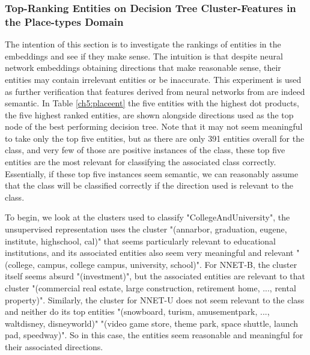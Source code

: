 \subsubsection{Top-Ranking Entities on Decision Tree Cluster-Features in the Place-types Domain}\label{ch5:place-typesentities}

The intention of this section is to investigate the rankings of entities in the embeddings and see if they make sense. The intuition is that despite neural network embeddings obtaining directions that make reasonable sense, their entities may contain irrelevant entities or be inaccurate. This experiment is used as further verification that features derived from neural networks from  are indeed semantic.  In Table \ref{ch5:placeent} the five entities with the highest dot products, the five highest ranked entities, are shown alongside directions used as the top node of the best performing decision tree. Note that it may not seem meaningful to take only the top five entities, but as there are only 391 entities overall for the class, and very few of those are positive instances of the class, these  top five entities are the most relevant for classifying the associated class correctly. Essentially, if these top five instances seem semantic, we can reasonably assume that the class will be classified correctly if the direction used is relevant to the class. 

To begin, we look at the clusters used to classify "CollegeAndUniversity", the unsupervised representation uses the cluster "(annarbor, graduation, eugene, institute, highschool, cal)" that seems particularly relevant to educational institutions, and its associated entities also seem very meaningful and relevant "(college, campus, college campus, university, school)". For NNET-B, the cluster itself seems absurd "(investment)", but the associated entities are relevant to that cluster "(commercial real estate, large construction, retirement home, ..., rental property)". Similarly, the cluster for NNET-U does not seem relevant to the class and neither do its top entities "(snowboard, turism, amusementpark, ..., waltdisney, disneyworld)" "(video game store, theme park, space shuttle, launch pad, speedway)". So in this case, the entities seem reasonable and meaningful for their associated directions.

